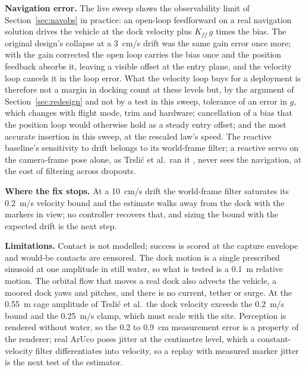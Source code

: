 \textbf{Navigation error.} The live sweep shows the observability limit of Section~\ref{sec:navobs} in practice: an open-loop feedforward on a real navigation solution drives the vehicle at the dock velocity plus $K_{ff}\,g$ times the bias. The original design's collapse at a 3~cm/s drift was the same gain error once more; with the gain corrected the open loop carries the bias once and the position feedback absorbs it, leaving a visible offset at the entry plane, and the velocity loop cancels it in the loop error. What the velocity loop buys for a deployment is therefore not a margin in docking count at these levels but, by the argument of Section~\ref{sec:redesign} and not by a test in this sweep, tolerance of an error in $g$, which changes with flight mode, trim and hardware; cancellation of a bias that the position loop would otherwise hold as a steady entry offset; and the most accurate insertion in this sweep, at the rescaled law's speed. The reactive baseline's sensitivity to drift belongs to its world-frame filter; a reactive servo on the camera-frame pose alone, as Trsli\'c et al.\ ran it \cite{trslic2020vision}, never sees the navigation, at the cost of filtering across dropouts.

\textbf{Where the fix stops.} At a 10~cm/s drift the world-frame filter saturates its 0.2~m/s velocity bound and the estimate walks away from the dock with the markers in view; no controller recovers that, and sizing the bound with the expected drift is the next step.

\textbf{Limitations.} Contact is not modelled; success is scored at the capture envelope and would-be contacts are censored. The dock motion is a single prescribed sinusoid at one amplitude in still water, so what is tested is a 0.1~m relative motion. The orbital flow that moves a real dock also advects the vehicle, a moored dock yaws and pitches, and there is no current, tether or surge. At the 0.55~m cage amplitude of Trsli\'c et al.\ the dock velocity exceeds the 0.2~m/s bound and the 0.25~m/s clamp, which must scale with the site. Perception is rendered without water, so the 0.2 to 0.9~cm measurement error is a property of the renderer; real ArUco poses jitter at the centimetre level, which a constant-velocity filter differentiates into velocity, so a replay with measured marker jitter is the next test of the estimator.

